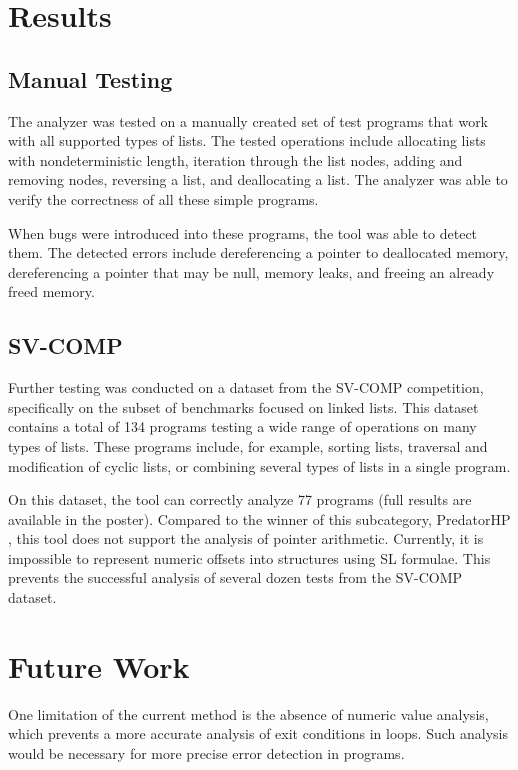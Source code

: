 \documentclass{ExcelAtFIT}
\begin{document}
\section{Results}

\subsection{Manual Testing}
The analyzer was tested on a manually created set of test programs that work with all supported types of lists. The tested operations include allocating lists with nondeterministic length, iteration through the list nodes, adding and removing nodes, reversing a list, and deallocating a list. The analyzer was able to verify the correctness of all these simple programs.

When bugs were introduced into these programs, the tool was able to detect them. The detected errors include dereferencing a pointer to deallocated memory, dereferencing a pointer that may be null, memory leaks, and freeing an already freed memory.

\subsection{SV-COMP}
Further testing was conducted on a dataset from the SV-COMP competition, specifically on the subset of benchmarks focused on linked lists. This dataset contains a total of 134 programs testing a wide range of operations on many types of lists. These programs include, for example, sorting lists, traversal and modification of cyclic lists, or combining several types of lists in a single program. 

On this dataset, the tool can correctly analyze 77 programs (full results are available in the poster). Compared to the winner of this subcategory, PredatorHP \cite{predatorHP}, this tool does not support the analysis of pointer arithmetic. Currently, it is impossible to represent numeric offsets into structures using SL formulae. This prevents the successful analysis of several dozen tests from the SV-COMP dataset.

\section{Future Work} 
One limitation of the current method is the absence of numeric value analysis, which prevents a more accurate analysis of exit conditions in loops. Such analysis would be necessary for more precise error detection in programs.
\end{document}
